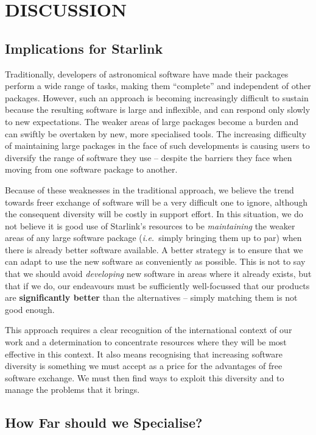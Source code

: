 \documentclass[twoside,11pt]{article}
\newcommand{\htmlref}[2]{#1}
\newcommand{\qt}[1]{``#1''}
\newcommand{\st}[1]{{\em{#1}}}
\newcommand{\qt}[1]{{\tt{"}}#1{\tt{"}}}
\newcommand{\dev}[1]{\htmlref{#1}{development}}
\newcommand{\mnt}[1]{\htmlref{#1}{maintenance}}
\begin{document}
\section{DISCUSSION}

\subsection{Implications for Starlink}

Traditionally, developers of astronomical software have made their
packages perform a wide range of tasks, making them \qt{complete} and
independent of other packages. However, such an approach is becoming
increasingly difficult to sustain because the resulting software is
large and inflexible, and can respond only slowly to new
expectations. The weaker areas of large packages become a burden and
can swiftly be overtaken by new, more specialised tools. The
increasing difficulty of maintaining large packages in the face of
such developments is causing users to diversify the range of software
they use -- despite the barriers they face when moving from one
software package to another.

Because of these weaknesses in the traditional approach, we believe
the trend towards freer exchange of software will be a very difficult
one to ignore, although the consequent diversity will be costly in
support effort.  In this situation, we do not believe it is good use of
Starlink's resources to be \st{\mnt{maintaining}} the weaker areas of any
large software package (\st{i.e.}\ simply bringing them up to par)
when there is already better software available. A better strategy is
to ensure that we can adapt to use the new software as conveniently as
possible. This is not to say that we should avoid \st{\dev{developing}} new
software in areas where it already exists, but that if we do, our
endeavours must be sufficiently well-focussed that our products are
{\bf significantly better} than the alternatives -- simply matching
them is not good enough.

This approach requires a clear recognition of the international
context of our work and a determination to concentrate resources where
they will be most effective in this context. It also means recognising
that increasing software diversity is something we must accept as a
price for the advantages of free software exchange. We must then find
ways to exploit this diversity and to manage the problems that it
brings.

\subsection{How Far should we Specialise?}
\end{document}
